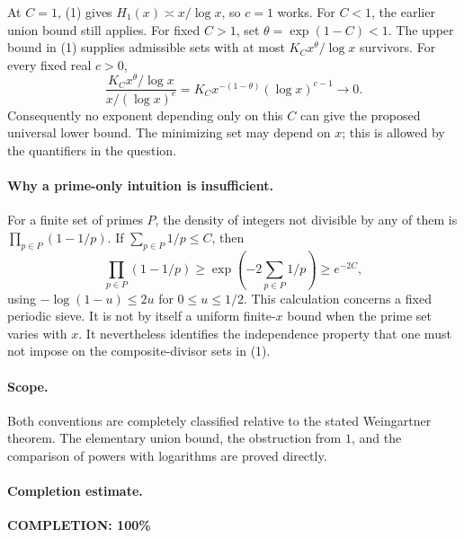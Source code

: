 At \(C=1\), (1) gives \(H_1(x)\asymp x/\log x\), so \(c=1\)
works. For \(C<1\), the earlier union bound still applies.
For fixed \(C>1\), set \(\theta=\exp(1-C)<1\).
The upper bound in (1) supplies admissible sets with
at most \(K_Cx^\theta/\log x\) survivors.
For every fixed real \(c>0\),
\[
 \frac{K_Cx^\theta/\log x}{x/(\log x)^c}
 =K_Cx^{-(1-\theta)}(\log x)^{c-1}\longrightarrow0.
\]
Consequently no exponent depending only on this \(C\)
can give the proposed universal lower bound.
The minimizing set may depend on \(x\); this is allowed
by the quantifiers in the question.

\paragraph{Why a prime-only intuition is insufficient.}
For a finite set of primes \(P\), the density of integers
not divisible by any of them is
\(\prod_{p\in P}(1-1/p)\).
If \(\sum_{p\in P}1/p\leq C\), then
\[
 \prod_{p\in P}(1-1/p)
 \geq\exp\left(-2\sum_{p\in P}1/p\right)\geq e^{-2C},
\]
using \(-\log(1-u)\leq2u\) for \(0\leq u\leq1/2\).
This calculation concerns a fixed periodic sieve. It is
not by itself a uniform finite-\(x\) bound when the prime
set varies with \(x\). It nevertheless identifies the
independence property that one must not impose on the
composite-divisor sets in (1).

\paragraph{Scope.}
Both conventions are completely classified relative to the
stated Weingartner theorem. The elementary union bound,
the obstruction from \(1\), and the comparison of powers
with logarithms are proved directly.

\paragraph{Completion estimate.}
\textbf{COMPLETION: 100\%}
